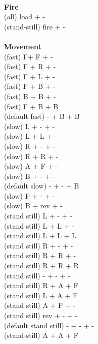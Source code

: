\ \\ {\bf Fire } \\
(all) load + - \\
(stand-still) fire + - \\
\ \\ {\bf Movement } \\
(fast) F+ F + - \\
(fast) F + R + - \\
(fast) F + L + - \\
(fast) F + B + - \\
(fast) B + B + - \\
(fast) F + B + B \\
(default fast) - + B + B \\
(slow) L + - + - \\
(slow) L + L + - \\
(slow) R + - + - \\
(slow) R + R + - \\
(slow) A + F + - \\
(slow) B + - + - \\
(default slow)  - + - + B \\
(slow) F + - + - \\
(slow) B + rev + - \\
(stand still) L + - + - \\
(stand still) L + L + - \\
(stand still) L + L + L \\
(stand still) R + - + - \\
(stand still) R + R + - \\
(stand still) R + R + R \\
(stand still) - + - + - \\
(stand still) R + A + F \\
(stand still) L + A + F \\
(stand still) A + F + - \\
(stand still) rev + - + - \\
(default stand still) - + - + - \\
(stand-still) A + A + F \\



